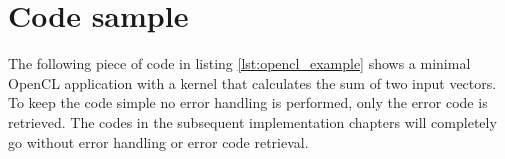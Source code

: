 \section{Code sample}
\label{sec:code_sample}

The following piece of code in listing \ref{lst:opencl_example} shows a minimal OpenCL application with a kernel that calculates the sum of two input vectors. To keep the code simple no error handling is performed, only the error code is retrieved. The codes in the subsequent implementation chapters will completely go without error handling or error code retrieval.

\pagebreak



